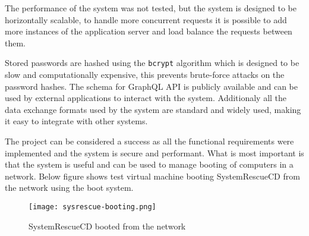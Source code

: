 \documentclass[./main.tex]{subfiles}
\begin{document}
The performance of the system was not tested, but the system is designed to be horizontally scalable, to handle more concurrent requests it is possible to add more instances of the application server and load balance the requests between them.

Stored passwords are hashed using the \texttt{bcrypt} algorithm which is designed to be slow and computationally expensive, this prevents brute-force attacks on the password hashes.
The schema for GraphQL API is publicly available and can be used by external applications to interact with the system.
Additionaly all the data exchange formats used by the system are standard and widely used, making it easy to integrate with other systems.

The project can be considered a success as all the functional requirements were implemented and the system is secure and performant.
What is most important is that the system is useful and can be used to manage booting of computers in a network.
Below figure shows test virtual machine booting SystemRescueCD from the network using the boot system.

\begin{figure}[H]
  \centering
  \texttt{[image: sysrescue-booting.png]}
  \caption{SystemRescueCD booted from the network}
\end{figure}
\end{document}

